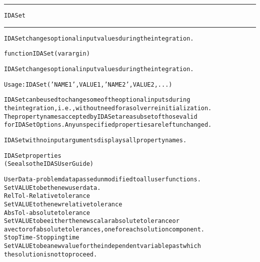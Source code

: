 \begin{samepage}
\hrule
\begin{center}
{\large \verb!IDASet!}
\label{p:IDASet}
\end{center}
\hrule\vspace{0.1in}



\begin{alltt}
IDASet changes optional input values during the integration.
\end{alltt}

\end{samepage}



\begin{samepage}


\begin{alltt}
function IDASet(varargin) 
\end{alltt}

\end{samepage}



\begin{alltt}
IDASet changes optional input values during the integration.

   Usage: IDASet('NAME1',VALUE1,'NAME2',VALUE2,...)

   IDASet can be used to change some of the optional inputs during
   the integration, i.e., without need for a solver reinitialization.
   The property names accepted by IDASet are a subset of those valid
   for IDASetOptions. Any unspecified properties are left unchanged.

   IDASet with no input arguments displays all property names. 

IDASet properties
(See also the IDAS User Guide)

UserData - problem data passed unmodified to all user functions.
  Set VALUE to be the new user data.
RelTol - Relative tolerance
  Set VALUE to the new relative tolerance
AbsTol - absolute tolerance
  Set VALUE to be either the new scalar absolute tolerance or
  a vector of absolute tolerances, one for each solution component.
StopTime - Stopping time
  Set VALUE to be a new value for the independent variable past which
  the solution is not to proceed.
\end{alltt}






\vspace{0.1in}